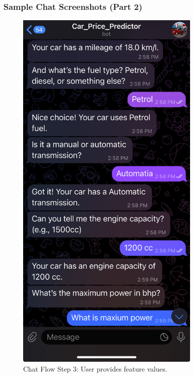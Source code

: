 \documentclass{beamer}
\begin{document}
\begin{frame}
\frametitle{Sample Chat Screenshots (Part 2)}

\begin{figure}[h!]
    \centering
    \begin{minipage}{0.45\textwidth}
        \centering
        \includegraphics[width=0.8\textwidth]{3.jpg}
        \caption{Chat Flow Step 3: User provides feature values.}
        \label{fig:step3}
    \end{minipage}%
    \hspace{0.05\textwidth} %
    \begin{minipage}{0.45\textwidth}

\end{minipage}
\end{figure}
\end{frame}
\end{document}
